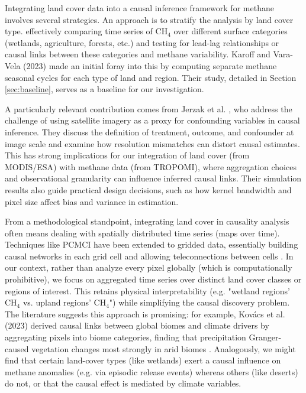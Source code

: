 Integrating land cover data into a causal inference framework for methane involves several strategies. An approach is to stratify the analysis by land cover type. effectively comparing time series of CH$_4$ over different surface categories (wetlands, agriculture, forests, etc.) and testing for lead-lag relationships or causal links between these categories and methane variability. Karoff and Vara-Vela (2023) \cite{Karoff2023} made an initial foray into this by computing separate methane seasonal cycles for each type of land and region. Their study, detailed in Section \ref{sec:baseline}, serves as a baseline for our investigation.

A particularly relevant contribution comes from Jerzak et al. \cite{jerzak2023}, who address the challenge of using satellite imagery as a proxy for confounding variables in causal inference. They discuss the definition of treatment, outcome, and confounder at image scale and examine how resolution mismatches can distort causal estimates. This has strong implications for our integration of land cover (from MODIS/ESA) with methane data (from TROPOMI), where aggregation choices and observational granularity can influence inferred causal links. Their simulation results also guide practical design decisions, such as how kernel bandwidth and pixel size affect bias and variance in estimation.

From a methodological standpoint, integrating land cover in causality analysis often means dealing with spatially distributed time series (maps over time). Techniques like PCMCI have been extended to gridded data, essentially building causal networks in each grid cell and allowing teleconnections between cells \cite{Runge2019, Runge2020EGU}. In our context, rather than analyze every pixel globally (which is computationally prohibitive), we focus on aggregated time series over distinct land cover classes or regions of interest. This retains physical interpretability (e.g. "wetland regions' CH$_4$ vs. upland regions' CH$_4$") while simplifying the causal discovery problem. The literature suggests this approach is promising: for example, Kovács et al. (2023) \cite{Kovacs2023} derived causal links between global biomes and climate drivers by aggregating pixels into biome categories, finding that precipitation Granger-caused vegetation changes most strongly in arid biomes \cite{Kovacs2023}. Analogously, we might find that certain land-cover types (like wetlands) exert a causal influence on methane anomalies (e.g. via episodic release events) whereas others (like deserts) do not, or that the causal effect is mediated by climate variables.

